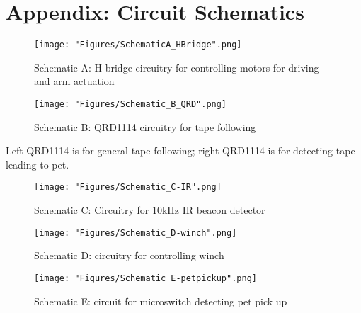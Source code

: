 \newpage	
\section{Appendix: Circuit Schematics}
\label{AppendixB}
\begin{figure}[h]
	\centering
	\texttt{[image: "Figures/SchematicA\_HBridge".png]}
	\caption*{Schematic A: H-bridge circuitry for controlling motors for driving and arm actuation}
	\label{sch:A}
\end{figure}
\newpage
\begin{figure}[h]
	\centering
	\texttt{[image: "Figures/Schematic\_B\_QRD".png]}
	\caption*{Schematic B: QRD1114 circuitry for tape following}
	\label{sch:B}
\end{figure}

Left QRD1114 is for general tape following; right QRD1114 is for detecting tape leading to pet.

\begin{figure}[h]
	\centering
	\texttt{[image: "Figures/Schematic\_C-IR".png]}
	\caption*{Schematic C: Circuitry for 10kHz IR beacon detector}
	\label{sch:C}
\end{figure}

\begin{figure}[h]
	\centering
	\texttt{[image: "Figures/Schematic\_D-winch".png]}
	\caption*{Schematic D: circuitry for controlling winch}
	\label{sch:D}
\end{figure}

\begin{figure}[h]
	\centering
	\texttt{[image: "Figures/Schematic\_E-petpickup".png]}
	\caption*{Schematic E: circuit for microswitch detecting pet pick up}
	\label{sch:E}
\end{figure}